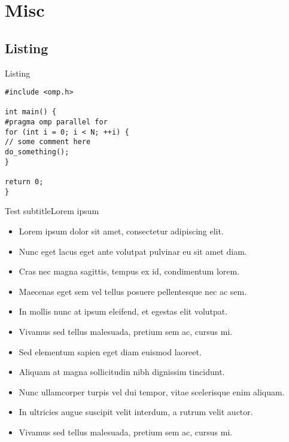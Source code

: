 \documentclass[aspectratio=169]{beamer}
\begin{document}

\section{Misc}
\subsection{Listing}
\begin{frame}
\subsectionpage
\end{frame}

\begin{frame}[fragile]{Listing}
\vfill
\begin{lstlisting}[style=mycstyle, caption={Loop parallelization with OpenMP}]
#include <omp.h>

int main() {
#pragma omp parallel for
for (int i = 0; i < N; ++i) {
// some comment here
do_something();
}

return 0;
}
\end{lstlisting}
\vfill
\end{frame}

\begin{frame}{Test subtitle}{Lorem ipsum}
\begin{itemize}
\item Lorem ipsum dolor sit amet, consectetur adipiscing elit.
\item Nunc eget lacus eget ante volutpat pulvinar eu sit amet diam.
\item Cras nec magna sagittis, tempus ex id, condimentum lorem.
\item Maecenas eget sem vel tellus posuere pellentesque nec ac sem.
\item In mollis nunc at ipsum eleifend, et egestas elit volutpat.
\item Vivamus sed tellus malesuada, pretium sem ac, cursus mi.
\item Sed elementum sapien eget diam euismod laoreet.
\item Aliquam at magna sollicitudin nibh dignissim tincidunt.
\item Nunc ullamcorper turpis vel dui tempor, vitae scelerisque enim aliquam.
\item In ultricies augue suscipit velit interdum, a rutrum velit auctor.
\item Vivamus sed tellus malesuada, pretium sem ac, cursus mi.
\end{itemize}
\end{frame}
\end{document}
